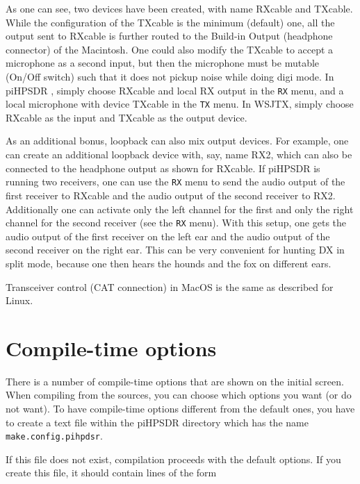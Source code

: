 \documentclass[12pt]{book}
\def\bltt#1{\texttt{\color{blue}#1}}
\def\grtt#1{\texttt{\color{magenta}#1}}
\def\pH{pi\-HPSDR }
\begin{document}
As one can see, two devices have been created, with name RXcable and TXcable.
While the configuration of the TXcable is the minimum (default) one, all the
output sent to RXcable is further routed to the Build-in Output (headphone
connector) of the Macintosh. One could also modify the TXcable to accept a
microphone as a second input, but then the microphone must be mutable
(On/Off switch) such that it does not pickup noise while doing digi mode.
In \pH, simply choose RXcable and local RX output in the \bltt{RX} menu,
and a local microphone with device TXcable in the \bltt{TX} menu. In WSJTX,
simply choose RXcable as the input and TXcable as the output device.

As an additional bonus, loopback can also mix output devices. For example, one can create
an additional loopback device with, say, name RX2, which can also be connected to
the headphone output as shown for RXcable. If \pH is running two receivers,
one can use the \bltt{RX} menu to send the audio output of the first receiver to RXcable
and the audio output of the second receiver to RX2. Additionally one can activate only
the left channel for the first and only the right channel for the second receiver
(see the \bltt{RX} menu). With this setup,
one gets the audio output of the first receiver on the left ear and the audio output of
the second receiver on the right ear. This can be very convenient for hunting DX in split mode,
because one then hears the hounds and the fox on different ears.

Transceiver control (CAT connection) in MacOS is the same as described for Linux.

\chapter{Compile-time options}
\label{sec:compiletime}

There is a number of compile-time options that are shown on the initial screen.
When compiling from the sources, you can choose which options you want (or do not want).
To have compile-time options different from the default ones, you have to create a text
file within the \pH directory which has the name \grtt{make.config.pihpdsr}.

If this file does not exist, compilation proceeds with the default options.
If you create this file, it should contain lines of the form
\end{document}
